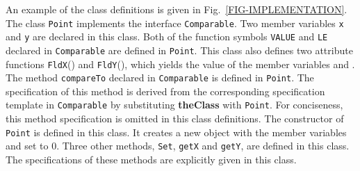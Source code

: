 \documentclass[fleqn]{llncs}
\begin{document}
\begin{example}
An example of the class definitions is given in Fig.~\ref{FIG-IMPLEMENTATION}. The class \texttt{Point} implements the interface \texttt{Comparable}.
Two member variables \texttt{x} and \texttt{y} are declared in this class. Both of the function symbols \texttt{VALUE} and \texttt{LE} declared in \texttt{Comparable} are defined in \texttt{Point}. This class also defines two attribute functions \texttt{FldX}() and \texttt{FldY}(), which yields the value of the member variables  and .
The method \texttt{compareTo} declared in \texttt{Comparable} is defined in \texttt{Point}. The specification of this method is
derived from the corresponding specification template in \texttt{Comparable} by substituting \textbf{theClass} with \texttt{Point}. For conciseness, this method specification is omitted in this class definitions.
The constructor of \texttt{Point} is defined in this class. It creates a new object with the member variables  and  set to 0. Three other methods, \texttt{Set}, \texttt{getX} and \texttt{getY}, are defined in this class. The specifications of these methods are explicitly given in this class.
\hfill
\end{example}
\end{document}
